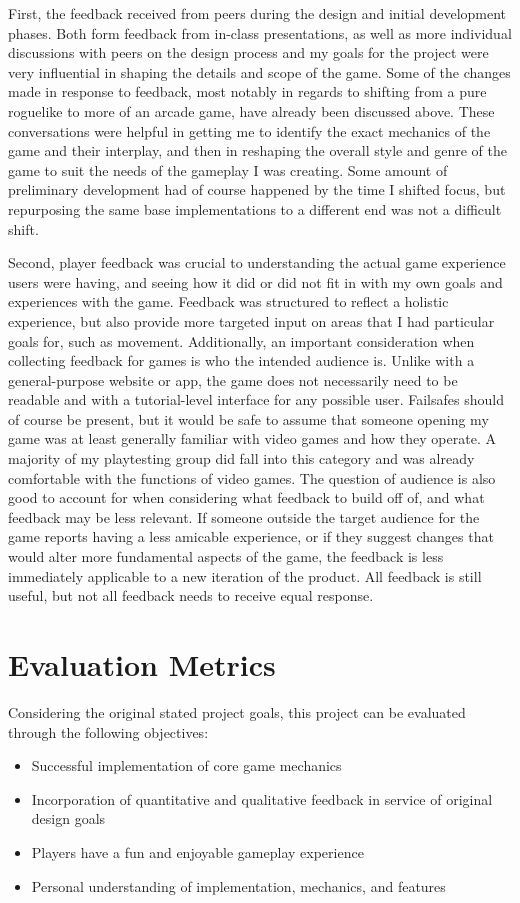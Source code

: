 \documentclass[10pt,twocolumn]{article}
\begin{document}
First, the feedback received from peers during the design and initial development phases. Both form feedback from in-class presentations, as well as more individual discussions with peers on the design process and my goals for the project were very influential in shaping the details and scope of the game. Some of the changes made in response to feedback, most notably in regards to shifting from a pure roguelike to more of an arcade game, have already been discussed above. These conversations were helpful in getting me to identify the exact mechanics of the game and their interplay, and then in reshaping the overall style and genre of the game to suit the needs of the gameplay I was creating. Some amount of preliminary development had of course happened by the time I shifted focus, but repurposing the same base implementations to a different end was not a difficult shift.

Second, player feedback was crucial to understanding the actual game experience users were having, and seeing how it did or did not fit in with my own goals and experiences with the game. Feedback was structured to reflect a holistic experience, but also provide more targeted input on areas that I had particular goals for, such as movement. Additionally, an important consideration when collecting feedback for games is who the intended audience is. Unlike with a general-purpose website or app, the game does not necessarily need to be readable and with a tutorial-level interface for any possible user. Failsafes should of course be present, but it would be safe to assume that someone opening my game was at least generally familiar with video games and how they operate. A majority of my playtesting group did fall into this category and was already comfortable with the functions of video games. The question of audience is also good to account for when considering what feedback to build off of, and what feedback may be less relevant. If someone outside the target audience for the game reports having a less amicable experience, or if they suggest changes that would alter more fundamental aspects of the game, the feedback is less immediately applicable to a new iteration of the product. All feedback is still useful, but not all feedback needs to receive equal response.

\section {Evaluation Metrics}
Considering the original stated project goals, this project can be evaluated through the following objectives:
\begin{itemize}
    \item Successful implementation of core game mechanics
    \item Incorporation of quantitative and qualitative feedback in service of original design goals
    \item Players have a fun and enjoyable gameplay experience
    \item Personal understanding of implementation, mechanics, and features
\end{itemize}
\end{document}

